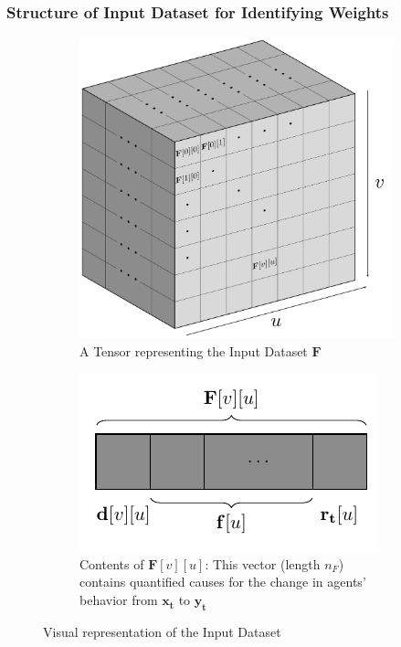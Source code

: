 \documentclass[12pt]{article}
\newcommand{\matr}[1]{\mathbf{#1}}  %
\newcommand{\tens}[1]{\mathbf{#1}}  %
\begin{document}
    \subsubsection{Structure of Input Dataset for Identifying Weights} \label{sec:Structure of Input Dataset for Identifying Weights}
    \begin{figure}[!htbp]
        \begin{subfigure}{.64\textwidth}
            \centering
            \includegraphics[width=\linewidth]{weights_input_dataset}
            \caption{A Tensor representing the Input Dataset $\tens{F}$}
            \label{fig:A Tensor representing the complete Input Dataset}
        \end{subfigure}
        \begin{subfigure}{.35\textwidth}
            \centering
            \includegraphics[width=\linewidth]{zoomup_Fuv}
            \caption{Contents of $\tens{F}[v][u]$: This vector (length $n_F$) contains quantified causes for the change in agents' behavior from $\matr{x_t}$ to $\matr{y_t}$}
            \label{fig:Zoomed-in contents of Fvu}
        \end{subfigure}
        \caption{Visual representation of the Input Dataset}
        \label{fig:Visual representation of the Input Dataset}
    \end{figure}
\end{document}
